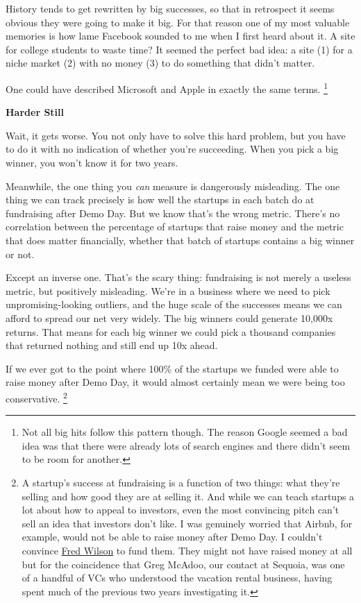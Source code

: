\documentclass[12pt]{book}
\begin{document}
History tends to get rewritten by big successes, so that in retrospect
it seems obvious they were going to make it big. For that reason one of
my most valuable memories is how lame Facebook sounded to me when I
first heard about it. A site for college students to waste time? It
seemed the perfect bad idea: a site (1) for a niche market (2) with no
money (3) to do something that didn't matter.

One could have described Microsoft and Apple in exactly the same terms.
\footnote{Not all big hits follow this pattern though. The reason Google
seemed a bad idea was that there were already lots of search engines and
there didn't seem to be room for another.}

\textbf{Harder Still}

Wait, it gets worse. You not only have to solve this hard problem, but
you have to do it with no indication of whether you're succeeding. When
you pick a big winner, you won't know it for two years.

Meanwhile, the one thing you \emph{can} measure is dangerously
misleading. The one thing we can track precisely is how well the
startups in each batch do at fundraising after Demo Day. But we know
that's the wrong metric. There's no correlation between the percentage
of startups that raise money and the metric that does matter
financially, whether that batch of startups contains a big winner or
not.

Except an inverse one. That's the scary thing: fundraising is not merely
a useless metric, but positively misleading. We're in a business where
we need to pick unpromising-looking outliers, and the huge scale of the
successes means we can afford to spread our net very widely. The big
winners could generate 10,000x returns. That means for each big winner
we could pick a thousand companies that returned nothing and still end
up 10x ahead.

If we ever got to the point where 100\% of the startups we funded were
able to raise money after Demo Day, it would almost certainly mean we
were being too conservative. \footnote{A startup's success at fundraising is a function of two things:
what they're selling and how good they are at selling it. And while we
can teach startups a lot about how to appeal to investors, even the most
convincing pitch can't sell an idea that investors don't like. I was
genuinely worried that Airbnb, for example, would not be able to raise
money after Demo Day. I couldn't convince \href{airbnb.html}{Fred
Wilson} to fund them. They might not have raised money at all but for
the coincidence that Greg McAdoo, our contact at Sequoia, was one of a
handful of VCs who understood the vacation rental business, having spent
much of the previous two years investigating it.}
\end{document}
